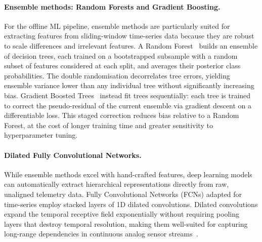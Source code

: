\paragraph{Ensemble methods: Random Forests and Gradient Boosting.}
For the offline ML pipeline, ensemble methods are particularly suited for extracting features from sliding-window time-series data because they are robust to scale differences and irrelevant features. A Random Forest~\cite{breiman_rf_2001} builds an ensemble of decision trees, each trained on a bootstrapped subsample with a random subset of features considered at each split, and averages their posterior class probabilities. The double randomisation decorrelates tree errors, yielding ensemble variance lower than any individual tree without significantly increasing bias. Gradient Boosted Trees~\cite{friedman_gb_2001} instead fit trees sequentially: each tree is trained to correct the pseudo-residual of the current ensemble via gradient descent on a differentiable loss. This staged correction reduces bias relative to a Random Forest, at the cost of longer training time and greater sensitivity to hyperparameter tuning.

\paragraph{Dilated Fully Convolutional Networks.}
While ensemble methods excel with hand-crafted features, deep learning models can automatically extract hierarchical representations directly from raw, unaligned telemetry data. Fully Convolutional Networks (FCNs) adapted for time-series employ stacked layers of 1D dilated convolutions. Dilated convolutions expand the temporal receptive field exponentially without requiring pooling layers that destroy temporal resolution, making them well-suited for capturing long-range dependencies in continuous analog sensor streams~\cite{bai2018tcn}.

